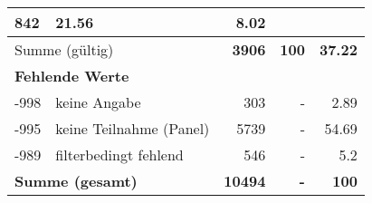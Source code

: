 \begin{longtable}{lXrrr}
       \num{842} &
       \num[round-mode=places,round-precision=2]{21.56} &
         \num[round-mode=places,round-precision=2]{8.02} \\
     \midrule
     \multicolumn{2}{l}{Summe (gültig)} &
       \textbf{\num{3906}} &
     \textbf{\num{100}} &
       \textbf{\num[round-mode=places,round-precision=2]{37.22}} \\
     \multicolumn{5}{l}{\textbf{Fehlende Werte}}\\
       -998 &
       keine Angabe &
         \num{303} &
        - &
         \num[round-mode=places,round-precision=2]{2.89} \\
       -995 &
       keine Teilnahme (Panel) &
         \num{5739} &
        - &
         \num[round-mode=places,round-precision=2]{54.69} \\
       -989 &
       filterbedingt fehlend &
         \num{546} &
        - &
         \num[round-mode=places,round-precision=2]{5.2} \\
     \midrule
     \multicolumn{2}{l}{\textbf{Summe (gesamt)}} &
          \textbf{\num{10494}} &
        \textbf{-} &
        \textbf{\num{100}} \\
     \bottomrule
     \end{longtable}
     
